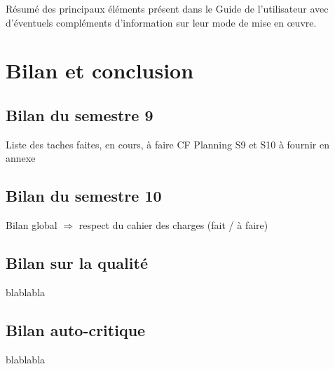 \documentclass{polytech/polytech}
\numberwithin{figure}{chapter}
\begin{document}
Résumé des principaux éléments présent dans le Guide de l'utilisateur
avec d'éventuels compléments d'information sur leur mode de mise en œuvre.


\chapter{Bilan et conclusion}

\section{Bilan du semestre 9}

Liste des taches faites, en cours, à faire
CF Planning S9 et S10 à fournir en annexe

\section{Bilan du semestre 10}

Bilan global $\Rightarrow$ respect du cahier des charges (fait / à faire)

\section{Bilan sur la qualité }
blablabla

\section{Bilan auto-critique}
blablabla
\end{document}
